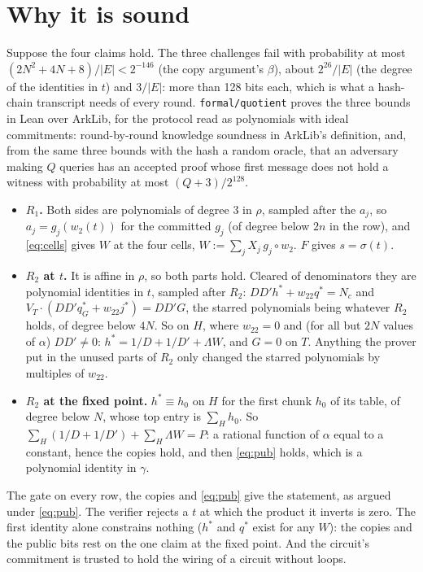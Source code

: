 \documentclass[11pt]{article}
\newcommand{\E}{E}
\newcommand{\code}[1]{\texttt{#1}}
\newcommand{\cells}{H}
\newcommand{\reps}{T}
\newcommand{\vT}{V_{\reps}}
\newcommand{\wit}{W}
\newcommand{\perm}{\sigma}
\newcommand{\pub}{\Lambda}
\newcommand{\gate}{G}
\newcommand{\target}{P}
\begin{document}
\section{Why it is sound}

Suppose the four claims hold. The three challenges fail with probability at most $(2 N^2 + 4 N + 8) / |\E| < 2^{-146}$ (the copy argument's $\beta$), about $2^{26} / |\E|$ (the degree of the identities in $t$) and $3 / |\E|$: more than 128 bits each, which is what a hash-chain transcript needs of every round. \code{formal/quotient} proves the three bounds in Lean over ArkLib, for the protocol read as polynomials with ideal commitments: round-by-round knowledge soundness in ArkLib's definition, and, from the same three bounds with the hash a random oracle, that an adversary making $Q$ queries has an accepted proof whose first message does not hold a witness with probability at most $(Q + 3) / 2^{128}$.
\begin{itemize}
  \item \textbf{$R_1$.} Both sides are polynomials of degree 3 in $\rho$, sampled after the $a_j$, so $a_j = g_j(w_2(t))$ for the committed $g_j$ (of degree below $2n$ in the row), and \eqref{eq:cells} gives $\wit$ at the four cells, $\wit := \sum_j X_j \, g_j \circ w_2$. $F$ gives $s = \perm(t)$.
  \item \textbf{$R_2$ at $t$.} It is affine in $\rho$, so both parts hold. Cleared of denominators they are polynomial identities in $t$, sampled after $R_2$: $D D' h^* + w_{22} q^* = N_c$ and $\vT \cdot (D D' q_\gate^* + w_{22} j^*) = D D' \gate$, the starred polynomials being whatever $R_2$ holds, of degree below $4N$. So on $\cells$, where $w_{22} = 0$ and (for all but $2N$ values of $\alpha$) $D D' \ne 0$: $h^* = 1/D + 1/D' + \pub \wit$, and $\gate = 0$ on $\reps$. Anything the prover put in the unused parts of $R_2$ only changed the starred polynomials by multiples of $w_{22}$.
  \item \textbf{$R_2$ at the fixed point.} $h^* \equiv h_0$ on $\cells$ for the first chunk $h_0$ of its table, of degree below $N$, whose top entry is $\sum_\cells h_0$. So $\sum_\cells (1/D + 1/D') + \sum_\cells \pub \wit = \target$: a rational function of $\alpha$ equal to a constant, hence the copies hold, and then \eqref{eq:pub} holds, which is a polynomial identity in $\gamma$.
\end{itemize}
The gate on every row, the copies and \eqref{eq:pub} give the statement, as argued under \eqref{eq:pub}. The verifier rejects a $t$ at which the product it inverts is zero. The first identity alone constrains nothing ($h^*$ and $q^*$ exist for any $\wit$): the copies and the public bits rest on the one claim at the fixed point. And the circuit's commitment is trusted to hold the wiring of a circuit without loops.
\end{document}
